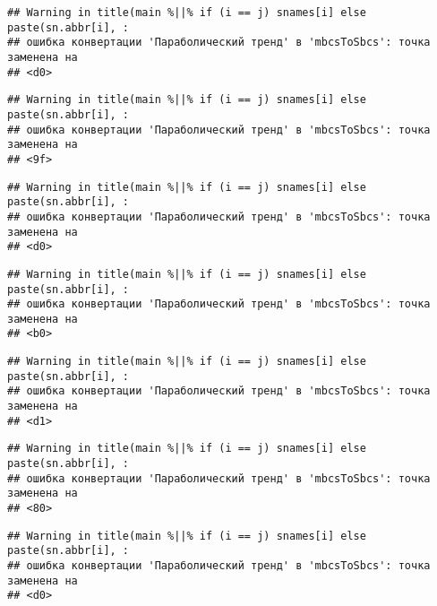 \documentclass[
]{article}
\newenvironment{Shaded}{\begin{snugshade}}{\end{snugshade}}
\newcommand{\AttributeTok}[1]{\textcolor[rgb]{0.13,0.29,0.53}{#1}}
\newcommand{\DecValTok}[1]{\textcolor[rgb]{0.00,0.00,0.81}{#1}}
\newcommand{\FunctionTok}[1]{\textcolor[rgb]{0.13,0.29,0.53}{\textbf{#1}}}
\newcommand{\NormalTok}[1]{#1}
\newcommand{\SpecialCharTok}[1]{\textcolor[rgb]{0.81,0.36,0.00}{\textbf{#1}}}
\newcommand{\StringTok}[1]{\textcolor[rgb]{0.31,0.60,0.02}{#1}}
\begin{document}
\begin{Shaded}
\end{Shaded}

\begin{verbatim}
## Warning in title(main %||% if (i == j) snames[i] else paste(sn.abbr[i], :
## ошибка конвертации 'Параболический тренд' в 'mbcsToSbcs': точка заменена на
## <d0>
\end{verbatim}

\begin{verbatim}
## Warning in title(main %||% if (i == j) snames[i] else paste(sn.abbr[i], :
## ошибка конвертации 'Параболический тренд' в 'mbcsToSbcs': точка заменена на
## <9f>
\end{verbatim}

\begin{verbatim}
## Warning in title(main %||% if (i == j) snames[i] else paste(sn.abbr[i], :
## ошибка конвертации 'Параболический тренд' в 'mbcsToSbcs': точка заменена на
## <d0>
\end{verbatim}

\begin{verbatim}
## Warning in title(main %||% if (i == j) snames[i] else paste(sn.abbr[i], :
## ошибка конвертации 'Параболический тренд' в 'mbcsToSbcs': точка заменена на
## <b0>
\end{verbatim}

\begin{verbatim}
## Warning in title(main %||% if (i == j) snames[i] else paste(sn.abbr[i], :
## ошибка конвертации 'Параболический тренд' в 'mbcsToSbcs': точка заменена на
## <d1>
\end{verbatim}

\begin{verbatim}
## Warning in title(main %||% if (i == j) snames[i] else paste(sn.abbr[i], :
## ошибка конвертации 'Параболический тренд' в 'mbcsToSbcs': точка заменена на
## <80>
\end{verbatim}

\begin{verbatim}
## Warning in title(main %||% if (i == j) snames[i] else paste(sn.abbr[i], :
## ошибка конвертации 'Параболический тренд' в 'mbcsToSbcs': точка заменена на
## <d0>
\end{verbatim}
\end{document}
